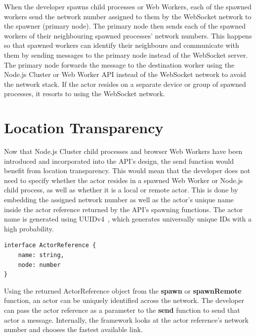 \documentclass[oneside]{um-fict}
\begin{document}
When the developer spawns child processes or Web Workers, each of the spawned workers send the network number assigned to them by the WebSocket network to the spawner (primary node). The primary node then sends each of the spawned workers of their neighbouring spawned processes' network numbers. This happens so that spawned workers can identify their neighbours and communicate with them by sending messages to the primary node instead of the WebSocket server. The primary node forwards the message to the destination worker using the Node.js Cluster or Web Worker API instead of the WebSocket network to avoid the network stack. If the actor resides on a separate device or group of spawned processes, it resorts to using the WebSocket network.
\section{Location Transparency}
Now that Node.js Cluster child processes and browser Web Workers have been introduced and incorporated into the API's design, the send function would benefit from location transparency. This would mean that the developer does not need to specify whether the actor resides in a spawned Web Worker or Node.js child process, as well as whether it is a local or remote actor. This is done by embedding the assigned network number as well as the actor's unique name inside the actor reference returned by the API's spawning functions. The actor name is generated using UUIDv4~\cite{uuidv4}, which generates universally unique IDs with a high probability.
\begin{lstlisting}
interface ActorReference {
    name: string,
    node: number
}
\end{lstlisting}
Using the returned ActorReference object from the \textbf{spawn} or \textbf{spawnRemote} function, an actor can be uniquely identified across the network. The developer can pass the actor reference as a parameter to the \textbf{send} function to send that actor a message. Internally, the framework looks at the actor reference's network number and chooses the fastest available link. 
\end{document}
